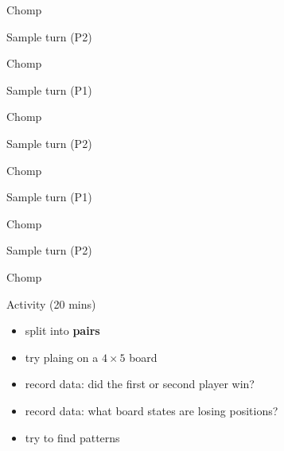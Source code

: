 \documentclass{beamer}
\begin{document}
\begin{frame}{Chomp}
  \begin{block}{Sample turn (P2)}
    \begin{center}
    \end{center}
  \end{block}
\end{frame}

\begin{frame}{Chomp}
  \begin{block}{Sample turn (P1)}
    \begin{center}
    \end{center}
  \end{block}
\end{frame}

\begin{frame}{Chomp}
  \begin{block}{Sample turn (P2)}
    \begin{center}
    \end{center}
  \end{block}
\end{frame}

\begin{frame}{Chomp}
  \begin{block}{Sample turn (P1)}
    \begin{center}
    \end{center}
  \end{block}
\end{frame}

\begin{frame}{Chomp}
  \begin{block}{Sample turn (P2)}
    \begin{center}
    \end{center}
  \end{block}
\end{frame}


\begin{frame}{Chomp}
  \begin{block}{Activity (20 mins)}
    \begin{itemize}
\pause
      \item split into \textbf{pairs}
\pause
      \item try plaing on a $4\times 5$ board
\pause
      \item {\color{red}record data:} did the first or second player win?
\pause
      \item {\color{red}record data:} what board states are losing positions?
\pause
      \item try to find {\color{blue}patterns}
    \end{itemize}
  \end{block}
\end{frame}
\end{document}

